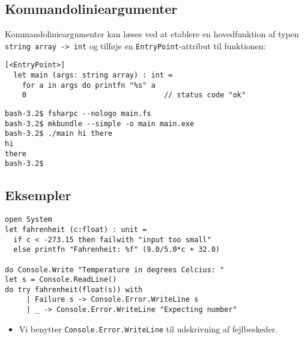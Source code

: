 \documentclass[rgb]{beamer}
\begin{document}
\subsection{Kommandolinieargumenter}

\begin{frame}[fragile]
\begin{footnotesize}


  Kommandolinieargumenter kan læses ved at etablere en hovedfunktion
  af typen \lstinline{string array -> int} og tilføje en
  \texttt{EntryPoint}-attribut til funktionen:

\begin{lstlisting}[numbers=none,frame=none,mathescape]
  [<EntryPoint>]
  let main (args: string array) : int =
    for a in args do printfn "%s" a
    0                                // status code "ok"
\end{lstlisting}


\begin{lstlisting}[numbers=none,frame=none]
bash-3.2$ fsharpc --nologo main.fs
bash-3.2$ mkbundle --simple -o main main.exe
bash-3.2$ ./main hi there
hi
there
bash-3.2$
\end{lstlisting}

\end{footnotesize}
\end{frame}

\subsection*{Eksempler}

\begin{frame}[fragile]
\begin{footnotesize}


\begin{lstlisting}[numbers=none,frame=none,mathescape]
open System
let fahrenheit (c:float) : unit =
  if c < -273.15 then failwith "input too small"
  else printfn "Fahrenheit: %f" (9.0/5.0*c + 32.0)

do Console.Write "Temperature in degrees Celcius: "
let s = Console.ReadLine()
do try fahrenheit(float(s)) with
     | Failure s -> Console.Error.WriteLine s
     | _ -> Console.Error.WriteLine "Expecting number"
\end{lstlisting}


\begin{itemize}
\item Vi benytter \lstinline{Console.Error.WriteLine} til udskrivning af fejlbeskeder.
\end{itemize}

\end{footnotesize}
\end{frame}
\end{document}
